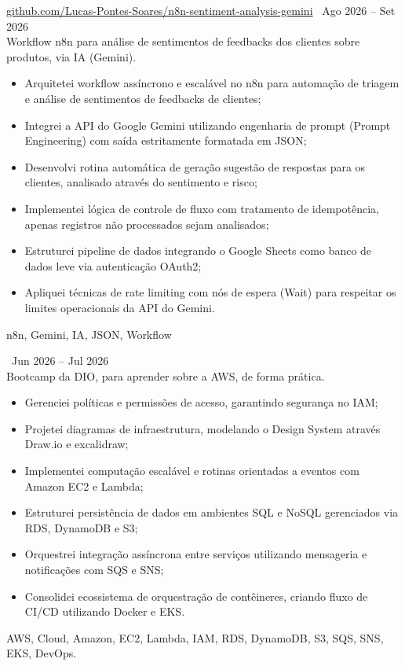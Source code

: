 
 \textbar{}  \href{https://github.com/Lucas-Pontes-Soares/n8n-sentiment-analysis-gemini}{github.com/Lucas-Pontes-Soares/n8n-sentiment-analysis-gemini} \hfill\ Ago 2026 -- Set 2026 \\
Workflow n8n para análise de sentimentos de feedbacks dos clientes sobre produtos, via IA (Gemini).
\begin{itemize}
    \item Arquitetei workflow assíncrono e escalável no n8n para automação de triagem e análise de sentimentos de feedbacks de clientes;
    \item Integrei a API do Google Gemini utilizando engenharia de prompt (Prompt Engineering) com saída estritamente formatada em JSON;
    \item Desenvolvi rotina automática de geração sugestão de respostas para os clientes, analisado através do sentimento e risco;
    \item Implementei lógica de controle de fluxo com tratamento de idempotência, apenas registros não processados sejam analisados;
    \item Estruturei pipeline de dados integrando o Google Sheets como banco de dados leve via autenticação OAuth2;
    \item Apliquei técnicas de rate limiting com nós de espera (Wait) para respeitar os limites operacionais da API do Gemini.
\end{itemize}
 n8n, Gemini, IA, JSON, Workflow

        
 \hfill\ Jun 2026 -- Jul 2026 \\
Bootcamp da DIO, para aprender sobre a AWS, de forma prática.
\begin{itemize}
    \item Gerenciei políticas e permissões de acesso, garantindo segurança no IAM;
    \item Projetei diagramas de infraestrutura, modelando o Design System através Draw.io e excalidraw;
    \item Implementei computação escalável e rotinas orientadas a eventos com Amazon EC2 e Lambda;
    \item Estruturei persistência de dados em ambientes SQL e NoSQL gerenciados via RDS, DynamoDB e S3;
    \item Orquestrei integração assíncrona entre serviços utilizando mensageria e notificações com SQS e SNS;
    \item Consolidei ecossistema de orquestração de contêineres, criando fluxo de CI/CD utilizando Docker e EKS.
\end{itemize}
 AWS, Cloud, Amazon, EC2, Lambda, IAM, RDS, DynamoDB, S3, SQS, SNS, EKS, DevOps.

